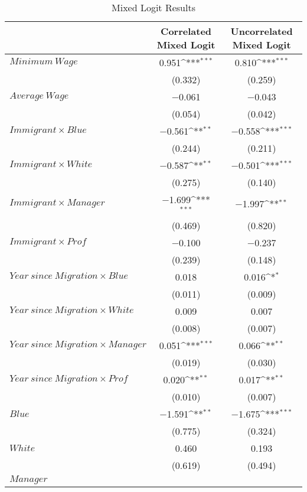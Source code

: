 {\scriptsize
\def\sym#1{\ifmmode^{#1}\else\(^{#1}\)\fi}
\begin{longtable}{lcc}
  \caption{Mixed Logit Results\label{tab:mixlogit}}\\
  \toprule
  & \multicolumn{1}{c}{Correlated Mixed Logit}
  & \multicolumn{1}{c}{Uncorrelated Mixed Logit} \\\hline
  $\mathit{Minimum\ Wage}$
  & 0.951\sym{***}
  & 0.810\sym{***}\\
  & (0.332)
  & (0.259) \\
  $\mathit{Average\ Wage}$
  & $-$0.061
  & $-$0.043 \\
  & (0.054)
  & (0.042) \\
  $\mathit{Immigrant}\times \mathit{Blue}$
  & $-$0.561\sym{**}
  & $-$0.558\sym{***}\\
  & (0.244)
  & (0.211) \\
  $\mathit{Immigrant}\times \mathit{White}$
  & $-$0.587\sym{**}
  & $-$0.501\sym{***}\\
  & (0.275)
  & (0.140) \\
  $\mathit{Immigrant}\times \mathit{Manager}$
  & $-$1.699\sym{***}
  & $-$1.997\sym{**} \\
  & (0.469)
  & (0.820) \\
  $\mathit{Immigrant}\times \mathit{Prof}$
  & $-$0.100
  & $-$0.237 \\
  & (0.239)
  & (0.148) \\
  $\mathit{Year\ since\ Migration}\times \mathit{Blue}$
  & 0.018
  & 0.016\sym{*}  \\
  & (0.011)
  & (0.009) \\
  $\mathit{Year\ since\ Migration}\times \mathit{White}$
  & 0.009
  & 0.007 \\
  & (0.008)
  & (0.007) \\
  $\mathit{Year\ since\ Migration}\times \mathit{Manager}$
  & 0.051\sym{***}
  & 0.066\sym{**} \\
  & (0.019)
  & (0.030) \\
  $\mathit{Year\ since\ Migration}\times \mathit{Prof}$
  & 0.020\sym{**}
  & 0.017\sym{**} \\
  & (0.010)
  & (0.007) \\
  $\mathit{Blue}$
  & $-$1.591\sym{**}
  & $-$1.675\sym{***}\\
  & (0.775)
  & (0.324) \\
  $\mathit{White}$
  & 0.460
  & 0.193 \\
  & (0.619)
  & (0.494) \\
  $\mathit{Manager}$

\end{longtable}}
